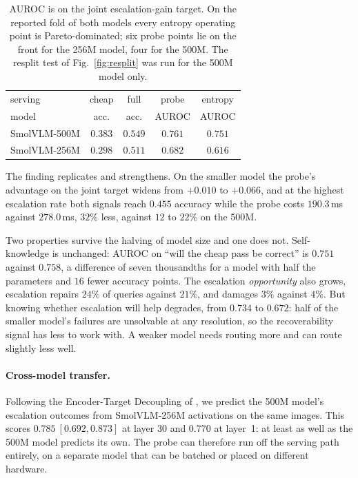 \documentclass[10pt,twocolumn]{article}
\theoremstyle{plain}
\begin{document}
\begin{table}[t]
\centering\small
\setlength{\tabcolsep}{4pt}
\begin{tabular}{lcccc}
\toprule
serving & cheap & full & probe & entropy \\
model & acc. & acc. & AUROC & AUROC \\
\midrule
SmolVLM-500M & $0.383$ & $0.549$ & $0.761$ & $0.751$ \\
SmolVLM-256M & $0.298$ & $0.511$ & $0.682$ & $0.616$ \\
\bottomrule
\end{tabular}
\caption{AUROC is on the joint escalation-gain target. On the reported fold of
both models every entropy operating point is Pareto-dominated; six probe points
lie on the front for the 256M model, four for the 500M. The resplit test of
Fig.~\ref{fig:resplit} was run for the 500M model only.}
\label{tab:replication}
\end{table}

The finding replicates and strengthens. On the smaller model the probe's
advantage on the joint target widens from $+0.010$ to $+0.066$, and at the
highest escalation rate both signals reach $0.455$ accuracy while the probe
costs $190.3$\,ms against $278.0$\,ms, $32\%$ less, against $12$ to $22\%$
on the 500M.

Two properties survive the halving of model size and one does not.
Self-knowledge is unchanged: AUROC on ``will the cheap pass be correct'' is
$0.751$ against $0.758$, a difference of seven thousandths for a model with
half the parameters and $16$ fewer accuracy points. The escalation
\emph{opportunity} also grows, escalation repairs $24\%$ of queries against
$21\%$, and damages $3\%$ against $4\%$. But knowing whether escalation will
help degrades, from $0.734$ to $0.672$: half of the smaller model's failures are
unsolvable at any resolution, so the recoverability signal has less to work
with. A weaker model needs routing more and can route slightly less well.

\paragraph{Cross-model transfer.} Following the Encoder-Target Decoupling of
\cite{llmrouter}, we predict the 500M model's escalation outcomes from
SmolVLM-256M activations on the same images. This scores $0.785\ [0.692,
0.873]$ at layer 30 and $0.770$ at layer~1: at least as well as the 500M model
predicts its own. The probe can therefore run off the serving path entirely, on
a separate model that can be batched or placed on different hardware.
\end{document}

